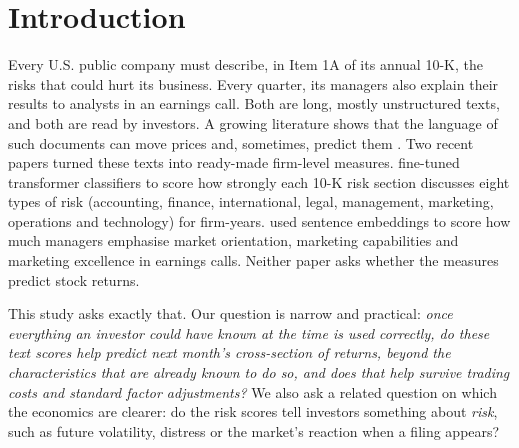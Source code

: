 \documentclass[11pt,a4paper]{article}
\begin{document}
\newpage
\tableofcontents
\newpage

\section{Introduction}

Every U.S. public company must describe, in Item 1A of its annual 10-K, the risks that could hurt its business. Every quarter,
its managers also explain their results to analysts in an earnings call. Both are long, mostly unstructured texts, and both
are read by investors. A growing literature shows that the language of such documents can move prices and, sometimes,
predict them \citep{loughran2011,price2012,cohen2020}. Two recent papers turned these texts into ready-made firm-level
measures. \citet{astvansh2026} fine-tuned transformer classifiers to score how strongly each 10-K risk section discusses
eight types of risk (accounting, finance, international, legal, management, marketing, operations and technology) for
\NFilings{} firm-years. \citet{damavandi2025} used sentence embeddings to score how much managers emphasise market
orientation, marketing capabilities and marketing excellence in earnings calls. Neither paper asks whether the measures
predict stock returns.

This study asks exactly that. Our question is narrow and practical: \emph{once everything an investor could have known
at the time is used correctly, do these text scores help predict next month's cross-section of returns, beyond the
characteristics that are already known to do so, and does that help survive trading costs and standard factor
adjustments?} We also ask a related question on which the economics are clearer: do the risk scores tell investors
something about \emph{risk}, such as future volatility, distress or the market's reaction when a filing appears?
\end{document}
